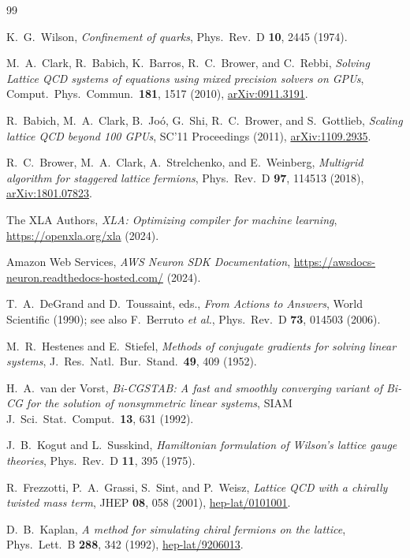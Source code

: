 \documentclass[a4paper,11pt]{article}
\begin{document}
\begin{thebibliography}{99}

K.~G.~Wilson,
\emph{Confinement of quarks},
Phys.\ Rev.\ D \textbf{10}, 2445 (1974).

M.~A.~Clark, R.~Babich, K.~Barros, R.~C.~Brower, and C.~Rebbi,
\emph{Solving Lattice QCD systems of equations using mixed precision
solvers on GPUs},
Comput.\ Phys.\ Commun.\ \textbf{181}, 1517 (2010),
\href{https://arxiv.org/abs/0911.3191}{arXiv:0911.3191}.

R.~Babich, M.~A.~Clark, B.~Jo\'o, G.~Shi, R.~C.~Brower, and S.~Gottlieb,
\emph{Scaling lattice QCD beyond 100 GPUs},
SC'11 Proceedings (2011),
\href{https://arxiv.org/abs/1109.2935}{arXiv:1109.2935}.

R.~C.~Brower, M.~A.~Clark, A.~Strelchenko, and E.~Weinberg,
\emph{Multigrid algorithm for staggered lattice fermions},
Phys.\ Rev.\ D \textbf{97}, 114513 (2018),
\href{https://arxiv.org/abs/1801.07823}{arXiv:1801.07823}.

The XLA Authors,
\emph{XLA: Optimizing compiler for machine learning},
\url{https://openxla.org/xla} (2024).

Amazon Web Services,
\emph{AWS Neuron SDK Documentation},
\url{https://awsdocs-neuron.readthedocs-hosted.com/} (2024).

T.~A.~DeGrand and D.~Toussaint, eds.,
\emph{From Actions to Answers}, World Scientific (1990);
see also F.~Berruto \emph{et al.}, Phys.\ Rev.\ D \textbf{73}, 014503 (2006).

M.~R.~Hestenes and E.~Stiefel,
\emph{Methods of conjugate gradients for solving linear systems},
J.\ Res.\ Natl.\ Bur.\ Stand.\ \textbf{49}, 409 (1952).

H.~A.~van der Vorst,
\emph{Bi-CGSTAB: A fast and smoothly converging variant of Bi-CG
for the solution of nonsymmetric linear systems},
SIAM J.\ Sci.\ Stat.\ Comput.\ \textbf{13}, 631 (1992).

J.~B.~Kogut and L.~Susskind,
\emph{Hamiltonian formulation of Wilson's lattice gauge theories},
Phys.\ Rev.\ D \textbf{11}, 395 (1975).

R.~Frezzotti, P.~A.~Grassi, S.~Sint, and P.~Weisz,
\emph{Lattice QCD with a chirally twisted mass term},
JHEP \textbf{08}, 058 (2001),
\href{https://arxiv.org/abs/hep-lat/0101001}{hep-lat/0101001}.

D.~B.~Kaplan,
\emph{A method for simulating chiral fermions on the lattice},
Phys.\ Lett.\ B \textbf{288}, 342 (1992),
\href{https://arxiv.org/abs/hep-lat/9206013}{hep-lat/9206013}.

\end{thebibliography}
\end{document}
